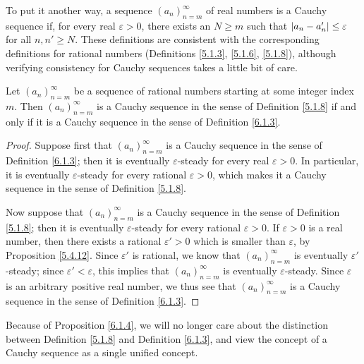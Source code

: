 \begin{note}
To put it another way, a sequence \((a_n)_{n = m}^\infty\) of real numbers is a Cauchy sequence if, for every real \(\varepsilon > 0\), there exists an \(N \geq m\) such that \(\abs*{a_n - a_n'} \leq \varepsilon\) for all \(n, n' \geq N\).
These definitions are consistent with the corresponding definitions for rational numbers (Definitions \ref{5.1.3}, \ref{5.1.6}, \ref{5.1.8}), although verifying consistency for Cauchy sequences takes a little bit of care.
\end{note}

\begin{proposition}\label{6.1.4}
Let \((a_n)_{n = m}^\infty\) be a sequence of rational numbers starting at some integer index \(m\).
Then \((a_n)_{n = m}^\infty\) is a Cauchy sequence in the sense of Definition \ref{5.1.8} if and only if it is a Cauchy sequence in the sense of Definition \ref{6.1.3}.
\end{proposition}

\begin{proof}
Suppose first that \((a_n)_{n = m}^\infty\) is a Cauchy sequence in the sense of Definition \ref{6.1.3};
then it is eventually \(\varepsilon\)-steady for every real \(\varepsilon > 0\).
In particular, it is eventually \(\varepsilon\)-steady for every rational \(\varepsilon > 0\), which makes it a Cauchy sequence in the sense of Definition \ref{5.1.8}.

Now suppose that \((a_n)_{n = m}^\infty\) is a Cauchy sequence in the sense of Definition \ref{5.1.8};
then it is eventually \(\varepsilon\)-steady for every rational \(\varepsilon > 0\).
If \(\varepsilon > 0\) is a real number, then there exists a rational \(\varepsilon' > 0\) which is smaller than \(\varepsilon\), by Proposition \ref{5.4.12}.
Since \(\varepsilon'\) is rational, we know that \((a_n)_{n = m}^\infty\) is eventually \(\varepsilon'\)-steady;
since \(\varepsilon' < \varepsilon\), this implies that \((a_n)_{n = m}^\infty\) is eventually \(\varepsilon\)-steady.
Since \(\varepsilon\) is an arbitrary positive real number, we thus see that \((a_n)_{n = m}^\infty\) is a Cauchy sequence in the sense of Definition \ref{6.1.3}.
\end{proof}

\begin{note}
Because of Proposition \ref{6.1.4}, we will no longer care about the distinction between Definition \ref{5.1.8} and Definition \ref{6.1.3}, and view the concept of a Cauchy sequence as a single unified concept.
\end{note}